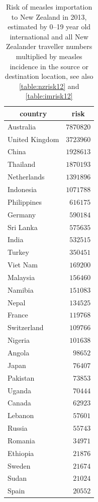 \documentclass{article}
\begin{document}
\begin{table}
\begin{center}
\begin{tabular}{lr}
\hline\hline
\multicolumn{1}{c}{country}&\multicolumn{1}{c}{risk}\tabularnewline
\hline
Australia&$7870820$\tabularnewline
United Kingdom&$3723960$\tabularnewline
China&$1928613$\tabularnewline
Thailand&$1870193$\tabularnewline
Netherlands&$1391896$\tabularnewline
Indonesia&$1071788$\tabularnewline
Philippines&$ 616175$\tabularnewline
Germany&$ 590184$\tabularnewline
Sri Lanka&$ 575635$\tabularnewline
India&$ 532515$\tabularnewline
Turkey&$ 350451$\tabularnewline
Viet Nam&$ 169200$\tabularnewline
Malaysia&$ 156460$\tabularnewline
Namibia&$ 151083$\tabularnewline
Nepal&$ 134525$\tabularnewline
France&$ 119768$\tabularnewline
Switzerland&$ 109766$\tabularnewline
Nigeria&$ 101638$\tabularnewline
Angola&$  98652$\tabularnewline
Japan&$  76407$\tabularnewline
Pakistan&$  73853$\tabularnewline
Uganda&$  70444$\tabularnewline
Canada&$  62923$\tabularnewline
Lebanon&$  57601$\tabularnewline
Russia&$  55743$\tabularnewline
Romania&$  34971$\tabularnewline
Ethiopia&$  21876$\tabularnewline
Sweden&$  21674$\tabularnewline
Sudan&$  21024$\tabularnewline
Spain&$  20552$\tabularnewline
\hline
\end{tabular}\end{center}\caption{Risk of measles importation to New Zealand in 2013, estimated by 0--19 year old international and all New Zealander traveller numbers multiplied by measles incidence in the source or destination location, see also \autoref{table:nzrisk12} and \autoref{table:imrisk12}}
\label{table:risk12}
\end{table}
\end{document}
